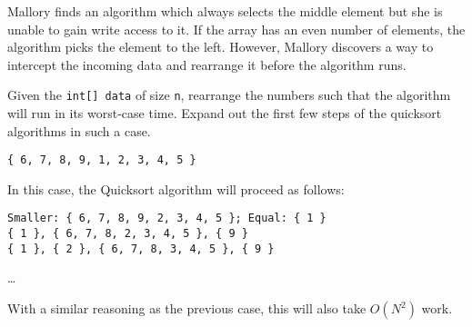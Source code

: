 \begin{blocksection}
\question Mallory finds an algorithm which always selects the middle element
but she is unable to gain write access to it. If the array has an even number
of elements, the algorithm picks the element to the left. However, Mallory
discovers a way to intercept the incoming data and rearrange it before the
algorithm runs.

Given the \lstinline$int[] data$ of size \lstinline$n$, rearrange the numbers
such that the algorithm will run in its worst-case time. Expand out the first
few steps of the quicksort algorithms in such a case.

\begin{solution}[1in]
\begin{verbatim}
{ 6, 7, 8, 9, 1, 2, 3, 4, 5 }
\end{verbatim}

In this case, the Quicksort algorithm will proceed as follows:

\begin{verbatim}
Smaller: { 6, 7, 8, 9, 2, 3, 4, 5 }; Equal: { 1 }
{ 1 }, { 6, 7, 8, 2, 3, 4, 5 }, { 9 }
{ 1 }, { 2 }, { 6, 7, 8, 3, 4, 5 }, { 9 }
\end{verbatim}
\ldots

With a similar reasoning as the previous case, this will also take $O(N^2)$
work.
\end{solution}
\end{blocksection}
